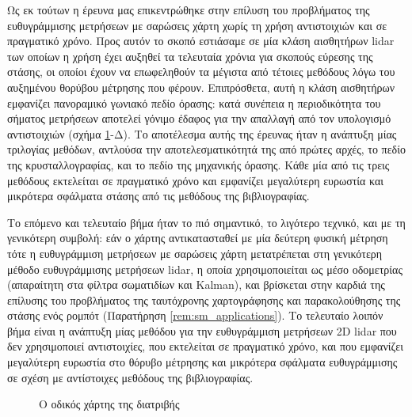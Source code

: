 Ως εκ τούτων η έρευνα μας επικεντρώθηκε στην επίλυση του προβλήματος της
ευθυγράμμισης μετρήσεων με σαρώσεις χάρτη χωρίς τη χρήση αντιστοιχιών και σε
πραγματικό χρόνο. Προς αυτόν το σκοπό εστιάσαμε σε μία κλάση αισθητήρων lidar
των οποίων η χρήση έχει αυξηθεί τα τελευταία χρόνια για σκοπούς εύρεσης της
στάσης, οι οποίοι έχουν να επωφεληθούν τα μέγιστα από τέτοιες μεθόδους λόγω
του αυξημένου θορύβου μέτρησης που φέρουν. Επιπρόσθετα, αυτή η κλάση αισθητήρων
εμφανίζει πανοραμικό γωνιακό πεδίο όρασης: κατά συνέπεια η περιοδικότητα του
σήματος μετρήσεων αποτελεί γόνιμο έδαφος για την απαλλαγή από τον υπολογισμό
αντιστοιχιών (σχήμα \ref{fig:roadmap}-Δ). Το αποτέλεσμα αυτής της έρευνας ήταν
η ανάπτυξη μίας τριλογίας μεθόδων, αντλούσα την αποτελεσματικότητά της από
πρώτες αρχές, το πεδίο της κρυσταλλογραφίας, και το πεδίο της μηχανικής όρασης.
Κάθε μία από τις τρεις μεθόδους εκτελείται σε πραγματικό χρόνο και εμφανίζει
μεγαλύτερη ευρωστία και μικρότερα σφάλματα στάσης από τις μεθόδους της
βιβλιογραφίας.

Το επόμενο και τελευταίο βήμα ήταν το πιό σημαντικό, το λιγότερο τεχνικό, και
με τη γενικότερη συμβολή: εάν ο χάρτης αντικατασταθεί με μία δεύτερη φυσική
μέτρηση τότε η ευθυγράμμιση μετρήσεων με σαρώσεις χάρτη μετατρέπεται στη
γενικότερη μέθοδο ευθυγράμμισης μετρήσεων lidar, η οποία χρησιμοποιείται
ως μέσο οδομετρίας (απαραίτητη στα φίλτρα σωματιδίων και Kalman), και βρίσκεται
στην καρδιά της επίλυσης του προβλήματος της ταυτόχρονης χαρτογράφησης και
παρακολούθησης της στάσης ενός ρομπότ (Παρατήρηση \ref{rem:sm_applications}).
Το τελευταίο λοιπόν βήμα είναι η ανάπτυξη μίας μεθόδου για την ευθυγράμμιση
μετρήσεων 2D lidar που δεν χρησιμοποιεί αντιστοιχίες, που εκτελείται σε
πραγματικό χρόνο, και που εμφανίζει μεγαλύτερη ευρωστία στο θόρυβο μέτρησης
και μικρότερα σφάλματα ευθυγράμμισης σε σχέση με αντίστοιχες μεθόδους της
βιβλιογραφίας.

\begin{figure}\hspace{-2cm}
  
  \caption{Ο οδικός χάρτης της διατριβής}
  \label{fig:roadmap}
\end{figure}
